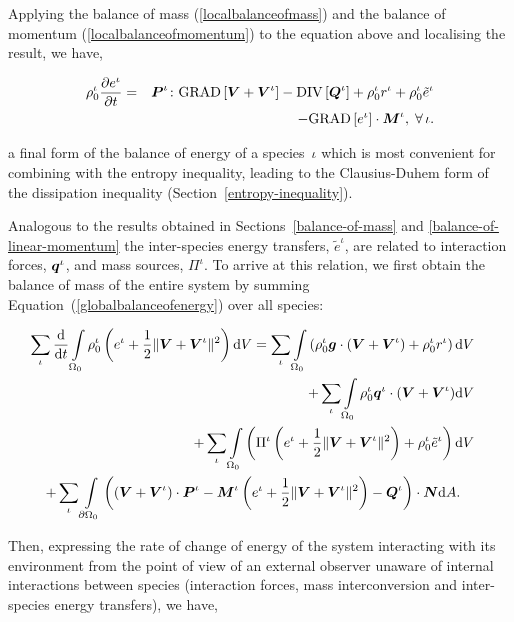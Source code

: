 \noindent Applying the balance of mass (\ref{localbalanceofmass}) and
the balance of momentum (\ref{localbalanceofmomentum}) to the equation
above and localising the result, we have,

\begin{eqnarray}
\rho^\iota_0\frac{\partial e^\iota}{\partial t} &=&
\mbox{\boldmath$ P$}^\iota\colon\mathrm{GRAD}\left[\mbox{\boldmath$ V$}+\mbox{\boldmath$ V$}^\iota\right]-
\mathrm{DIV}\left[\mbox{\boldmath$ Q$}^\iota\right] + \rho_0^\iota r^\iota
+\rho^\iota_0\tilde{e}^\iota\nonumber\\
& & - \mathrm{GRAD}\left[e^\iota\right]\cdot\mbox{\boldmath$ M$}^\iota,
\;\forall\,\iota.
\label{localbalanceofenergy}
\end{eqnarray}

\noindent a final form of the balance of energy of a species~$\iota$
which is most convenient for combining with the entropy inequality,
leading to the Clausius-Duhem form of the dissipation inequality
(Section~\ref{entropy-inequality}).

Analogous to the results obtained in Sections~\ref{balance-of-mass}
and \ref{balance-of-linear-momentum} the inter-species energy
transfers, $\tilde{e}^{\iota}$, are related to interaction forces,
$\mbox{\boldmath$ q$}^{\iota}$, and mass sources, $\Pi^{\iota}$. To arrive at this
relation, we first obtain the balance of mass of the entire system by
summing Equation~(\ref{globalbalanceofenergy}) over all species:

\begin{eqnarray}
\sum\limits_{\iota}\frac{\mathrm{d}}{\mathrm{d}t}
\int\limits_{\Omega_0}\rho_0^\iota \left ( e^\iota + \frac{1}{2}
\Vert\mbox{\boldmath$ V$}+\mbox{\boldmath$ V$}^\iota\Vert^2 \right ) \mathrm{d}V =
\sum\limits_{\iota}\int\limits_{\Omega_0} \left(\rho_0^\iota\mbox{\boldmath$ g$}
\cdot\left(\mbox{\boldmath$ V$}+\mbox{\boldmath$ V$}^\iota\right) + \rho_0^\iota r^\iota
\right)\mathrm{d}V& &\nonumber\\ +
\sum\limits_{\iota}\int\limits_{\Omega_0}
\rho_0^\iota\mbox{\boldmath$ q$}^\iota\cdot(\mbox{\boldmath$ V$}+\mbox{\boldmath$ V$}^\iota)\mathrm{d}V& &\nonumber\\ +
\sum\limits_{\iota}\int\limits_{\Omega_0} \left(\Pi^\iota\left(e^\iota
+ \frac{1}{2}\Vert\mbox{\boldmath$ V$}+\mbox{\boldmath$ V$}^\iota\Vert^2\right) +
\rho^\iota_0\tilde{e}^\iota\right)\mathrm{d}V \label{energysummation}&
& \\ +\sum\limits_{\iota}\int\limits_{\partial
  \Omega_0}\left(\left(\mbox{\boldmath$ V$}+\mbox{\boldmath$ V$}^\iota\right)\cdot\mbox{\boldmath$ P$}^\iota -
\mbox{\boldmath$ M$}^\iota\left(e^\iota +\frac{1}{2} \Vert\mbox{\boldmath$ V$}+\mbox{\boldmath$ V$}^\iota\Vert^2\right) -
\mbox{\boldmath$ Q$}^\iota\right)\cdot\mbox{\boldmath$ N$}\mathrm{d}A.\quad& & \nonumber
\end{eqnarray}

Then, expressing the rate of change of energy of the system
interacting with its environment from the point of view of an external
observer unaware of internal interactions between species (interaction
forces, mass interconversion and inter-species energy transfers), we
have,

